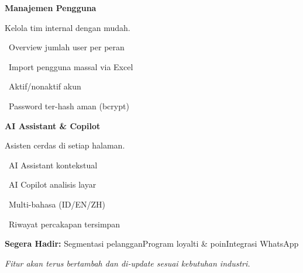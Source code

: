 \documentclass[a4paper]{article}
\begin{document}
\noindent
\begin{minipage}[t]{0.485\textwidth}
    \colorbox{OrangePrimary}{%
        \begin{minipage}{\dimexpr\textwidth-2\fboxsep\relax}
            {\fontsize{10}{13}\selectfont\bfseries\color{White} Manajemen Pengguna}
        \end{minipage}}\par
    \vspace{4pt}
    {\fontsize{9}{12}\selectfont\color{TextDark}%
    Kelola tim internal dengan mudah.\par\vspace{3pt}
    \textbullet\ Overview jumlah user per peran\par\vspace{2pt}%
    \textbullet\ Import pengguna massal via Excel\par\vspace{2pt}%
    \textbullet\ Aktif/nonaktif akun\par\vspace{2pt}%
    \textbullet\ Password ter-hash aman (bcrypt)}%

\end{minipage}%
\hfill
\begin{minipage}[t]{0.485\textwidth}
    \colorbox{EmeraldDark}{%
        \begin{minipage}{\dimexpr\textwidth-2\fboxsep\relax}
            {\fontsize{10}{13}\selectfont\bfseries\color{White} AI Assistant \& Copilot}
        \end{minipage}}\par
    \vspace{4pt}
    {\fontsize{9}{12}\selectfont\color{TextDark}%
    Asisten cerdas di setiap halaman.\par\vspace{3pt}
    \textbullet\ AI Assistant kontekstual\par\vspace{2pt}%
    \textbullet\ AI Copilot analisis layar\par\vspace{2pt}%
    \textbullet\ Multi-bahasa (ID/EN/ZH)\par\vspace{2pt}%
    \textbullet\ Riwayat percakapan tersimpan}%

\end{minipage}

\vspace{8pt}

{\setlength{\fboxsep}{8pt}\setlength{\fboxrule}{0pt}%
\noindent\colorbox{BlueBg}{%
    \begin{minipage}{\dimexpr\textwidth-2\fboxsep\relax}
        {\fontsize{9}{12}\selectfont\bfseries\color{BlueDark} Segera Hadir:}\enspace
        {\fontsize{9}{12}\selectfont\color{TextDark} Segmentasi pelanggan\enspace\textcolor{BluePrimary}{\textbullet}\enspace Program loyalti \& poin\enspace\textcolor{BluePrimary}{\textbullet}\enspace Integrasi WhatsApp}\par\vspace{3pt}
        {\fontsize{8.5}{11}\selectfont\color{TextLight}\textit{Fitur akan terus bertambah dan di-update sesuai kebutuhan industri.}}
    \end{minipage}}}
\end{document}
